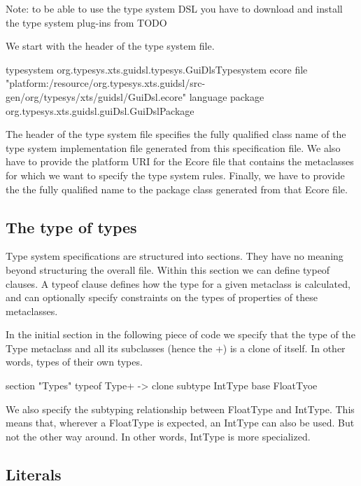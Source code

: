 Note: to be able to use the type system DSL you have to download and install the
type system plug-ins from TODO

We start with the header of the type system file.

\begin{code}
typesystem org.typesys.xts.guidsl.typesys.GuiDlsTypesystem 
    ecore file "platform:/resource/org.typesys.xts.guidsl/src-gen/org/typesys/xts/guidsl/GuiDsl.ecore"
    language package org.typesys.xts.guidsl.guiDsl.GuiDslPackage 
\end{code}

The header of the type system file specifies the fully qualified class name of
the type system implementation file generated from this specification file. We
also have to provide the platform URI for the Ecore file that contains the
metaclasses for which we want to specify the type system rules. Finally, we have
to provide the the fully qualified name  to the package class  generated from
that Ecore file.

\subsection{The type of types}

Type system specifications  are structured into sections. They have no meaning
beyond structuring the overall file. Within this section we can define typeof
clauses. A typeof clause defines how the type for a given metaclass is
calculated, and can optionally specify constraints on the types of properties of
these metaclasses.

In the initial section in the following piece of code we specify  that the type
of the Type metaclass and all its subclasses (hence the +) is a clone of itself.
In other words, types of their own types.

\begin{code}
section "Types"
    typeof Type+ -> clone
    subtype IntType base FloatTyoe
\end{code}

We also specify the subtyping relationship between FloatType and IntType. This
means that, wherever a FloatType is expected, an IntType can also be used.  But
not the other way around. In other words, IntType is more specialized.

\subsection{Literals}

